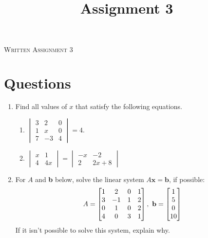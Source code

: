 \documentclass{article}
\title{Assignment 3}
\date{}
\begin{document}
\begin{center}
\textsc{\LARGE Written Assignment 3}\\[0.5cm]
\end{center}

\section*{Questions}

\begin{enumerate}
\item

Find all values of $x$ that satisfy the following equations.

\begin{enumerate}
\item \(
 \begin{vmatrix}
  3 &  2 &  0 \\
  1 &  x &  0 \\
  7 & -3 &  4
 \end{vmatrix} = 4.
\)
\item \(
 \begin{vmatrix}
  x & 1 \\
  4 & 4x
 \end{vmatrix} = \begin{vmatrix}
  -x & -2 \\
  2 & 2x + 8
 \end{vmatrix}
\)
\end{enumerate}

\item
For $A$ and \textbf{b} below, solve the linear system $A\mathbf{x} = \mathbf{b}$, if possible:
\begin{align*}
 A = \BM
  1 & 2 & 0 & 1 \\
  3 & -1 & 1 & 2 \\
  0 & 1 & 0 & 2 \\
  4 & 0 & 3 & 1
 \EM, \ 
 \mathbf{b} = \begin{bmatrix} 1 \\ 5 \\ 0 \\ 10 \end{bmatrix}
\end{align*}
 If it isn't possible to solve this system, explain why. 


\end{enumerate}
\end{document}
